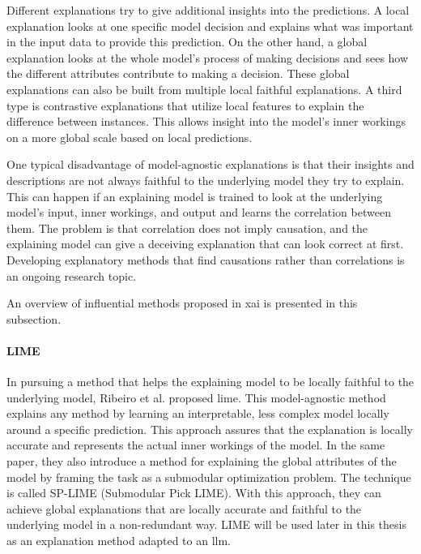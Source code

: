 Different explanations try to give additional insights into the predictions. A local explanation looks at one specific model decision and explains what was important in the input data to provide this prediction. On the other hand, a global explanation looks at the whole model's process of making decisions and sees how the different attributes contribute to making a decision. These global explanations can also be built from multiple local faithful explanations. A third type is contrastive explanations that utilize local features to explain the difference between instances. This allows insight into the model's inner workings on a more global scale based on local predictions.

One typical disadvantage of model-agnostic explanations is that their insights and descriptions are not always faithful to the underlying model they try to explain. This can happen if an explaining model is trained to look at the underlying model's input, inner workings, and output and learns the correlation between them. The problem is that correlation does not imply causation, and the explaining model can give a deceiving explanation that can look correct at first. Developing explanatory methods that find causations rather than correlations is an ongoing research topic.


An overview of influential methods proposed in \gls{xai} is presented in this subsection.




\paragraph{LIME\\}
In pursuing a method that helps the explaining model to be locally faithful to the underlying model, Ribeiro et al. \cite{ribeiroWhyShouldTrust2016} proposed \gls{lime}. This model-agnostic method explains any method by learning an interpretable, less complex model locally around a specific prediction. This approach assures that the explanation is locally accurate and represents the actual inner workings of the model. 
In the same paper, they also introduce a method for explaining the global attributes of the model by framing the task as a submodular optimization problem. The technique is called SP-LIME (Submodular Pick LIME). With this approach, they can achieve global explanations that are locally accurate and faithful to the underlying model in a non-redundant way. LIME will be used later in this thesis as an explanation method adapted to an \gls{llm}.

